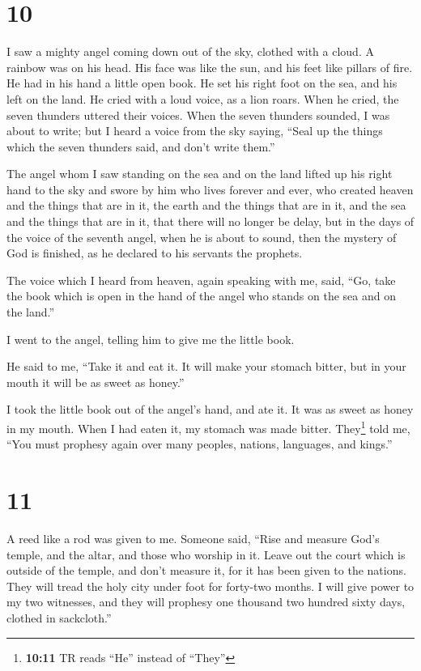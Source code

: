 \hypertarget{section-9}{%
\section{10}\label{section-9}}

 I saw a mighty angel coming down out of the sky, clothed
with a cloud. A rainbow was on his head. His face was like the sun, and
his feet like pillars of fire.  He had in his hand a
little open book. He set his right foot on the sea, and his left on the
land.  He cried with a loud voice, as a lion roars. When
he cried, the seven thunders uttered their voices.  When
the seven thunders sounded, I was about to write; but I heard a voice
from the sky saying, ``Seal up the things which the seven thunders said,
and don't write them.''

 The angel whom I saw standing on the sea and on the land
lifted up his right hand to the sky  and swore by him who
lives forever and ever, who created heaven and the things that are in
it, the earth and the things that are in it, and the sea and the things
that are in it, that there will no longer be delay,  but
in the days of the voice of the seventh angel, when he is about to
sound, then the mystery of God is finished, as he declared to his
servants the prophets.

 The voice which I heard from heaven, again speaking with
me, said, ``Go, take the book which is open in the hand of the angel who
stands on the sea and on the land.''

 I went to the angel, telling him to give me the little
book.

He said to me, ``Take it and eat it. It will make your stomach bitter,
but in your mouth it will be as sweet as honey.''

 I took the little book out of the angel's hand, and ate
it. It was as sweet as honey in my mouth. When I had eaten it, my
stomach was made bitter.  They\footnote{\textbf{10:11} TR
  reads ``He'' instead of ``They''} told me, ``You must prophesy again
over many peoples, nations, languages, and kings.''

\hypertarget{section-10}{%
\section{11}\label{section-10}}

 A reed like a rod was given to me. Someone said, ``Rise
and measure God's temple, and the altar, and those who worship in it.
 Leave out the court which is outside of the temple, and
don't measure it, for it has been given to the nations. They will tread
the holy city under foot for forty-two months.  I will
give power to my two witnesses, and they will prophesy one thousand two
hundred sixty days, clothed in sackcloth.''

